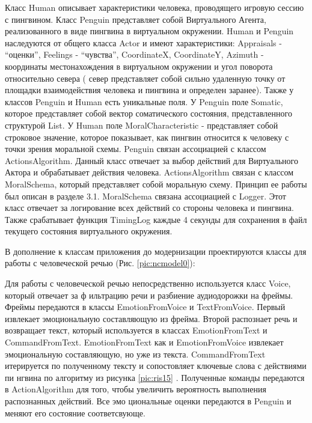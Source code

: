 Класс Human описывает характеристики человека, проводящего игровую сессию с пингвином. 
Класс Penguin представляет собой Виртуального Агента, реализованного в виде пингвина в виртуальном окружении. 
Human и Penguin наследуются от общего класса Actor и имеют характеристики: Appraisals - “оценки”, Feelings - “чувства”, 
CoordinateX, CoordinateY, Azimuth - координаты местонахождения в виртуальном окружении и угол поворота относительно севера (
север представляет собой сильно удаленную точку от площадки взаимодействия человека и пингвина и определен заранее).  
Также у классов Penguin и Human есть уникальные поля. У Penguin поле Somatic, которое представляет собой вектор соматического состояния, 
представленного структурой List. У Human поле MoralCharacteristic - представляет собой строковое значение, которое показывает, 
как пингвин относится к человеку с точки зрения моральной схемы. Penguin связан ассоциацией с классом ActionsAlgorithm. 
Данный класс отвечает за выбор действий для Виртуального Актора и обрабатывает действия человека. ActionsAlgorithm связан с классом MoralSchema, 
который представляет собой моральную схему. Принцип ее работы был описан в разделе 3.1. MoralSchema связана ассоциацией с Logger. 
Этот класс отвечает за логирование всех действий со стороны человека и пингвина. Также срабатывает функция TimingLog каждые 4 
секунды для сохранения в файл текущего состояния виртуального окружения.

В дополнение к классам приложения до модернизации проектируются классы для работы с человеческой речью (Рис. \ref{pic:ncmodel0}):

Для работы с человеческой речью непосредственно используется класс Voice, который отвечает за ф  
ильтрацию речи и разбиение аудиодорожки на фреймы. Фреймы передаются в классы EmotionFromVoice   
и TextFromVoice. Первый извлекает эмоциональную составляющую из фрейма. Второй распознает речь   
и возвращает текст, который используется в классах EmotionFromText и CommandFromText.   
EmotionFromText как и EmotionFromVoice извлекает эмоциональную составляющую, но уже из текста. 
CommandFromText итерируется по полученному тексту и сопостовляет ключевые слова с действиями пи  
нгвина по алгоритму из рисунка \ref{pic:ris15} . Полученные команды передаются в   
ActionAlgorithm для того, чтобы увеличить вероятность выполнения распознанных действий. Все эмо  
циональные оценки передаются в Penguin и меняют его состояние соответсвующе.

